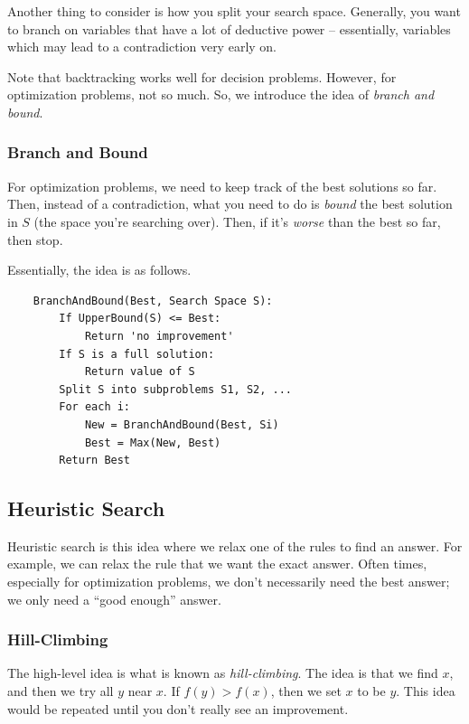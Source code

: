 \documentclass[letterpaper]{article}
\begin{document}
\bigskip 

Another thing to consider is how you split your search space. Generally, you want to branch on variables that have a lot of deductive power -- essentially, variables which may lead to a contradiction very early on. 

\bigskip 

Note that backtracking works well for decision problems. However, for optimization problems, not so much. So, we introduce the idea of \emph{branch and bound}.

\subsubsection{Branch and Bound}
For optimization problems, we need to keep track of the best solutions so far. Then, instead of a contradiction, what you need to do is \emph{bound} the best solution in $S$ (the space you're searching over). Then, if it's \emph{worse} than the best so far, then stop. 

\bigskip 

Essentially, the idea is as follows. 
\begin{verbatim}
    BranchAndBound(Best, Search Space S):
        If UpperBound(S) <= Best:
            Return 'no improvement' 
        If S is a full solution: 
            Return value of S 
        Split S into subproblems S1, S2, ... 
        For each i: 
            New = BranchAndBound(Best, Si)
            Best = Max(New, Best)
        Return Best 
\end{verbatim}


\subsection{Heuristic Search}
Heuristic search is this idea where we relax one of the rules to find an answer. For example, we can relax the rule that we want the exact answer. Often times, especially for optimization problems, we don't necessarily need the best answer; we only need a ``good enough'' answer. 

\subsubsection{Hill-Climbing}
The high-level idea is what is known as \emph{hill-climbing}. The idea is that we find $x$, and then we try all $y$ near $x$. If $f(y) > f(x)$, then we set $x$ to be $y$. This idea would be repeated until you don't really see an improvement. 
\end{document}
